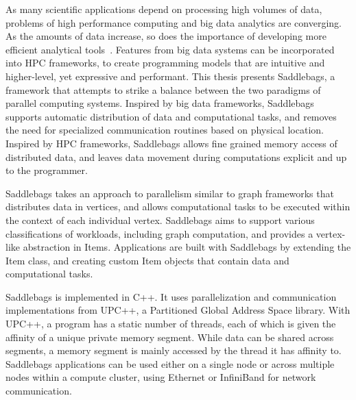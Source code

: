 \documentclass{uit-report}
\begin{document}
As many scientific applications depend on processing high volumes of data, problems of high performance computing and big data analytics are converging. As the amounts of data increase, so does the importance of developing more efficient analytical tools~\cite{hpcabds}. Features from big data systems can be incorporated into HPC frameworks, to create programming models that are intuitive and higher-level, yet expressive and performant. This thesis presents Saddlebags, a framework that attempts to strike a balance between the two paradigms of parallel computing systems. Inspired by big data frameworks, Saddlebags supports automatic distribution of data and computational tasks, and removes the need for specialized communication routines based on physical location. Inspired by HPC frameworks, Saddlebags allows fine grained memory access of distributed data, and leaves data movement during computations explicit and up to the programmer.

Saddlebags takes an approach to parallelism similar to graph frameworks \cite{pregel} \cite{giraph} that distributes data in vertices, and allows computational tasks to be executed within the context of each individual vertex. Saddlebags aims to support various classifications of workloads, including graph computation, and provides a vertex-like abstraction in Items. Applications are built with Saddlebags by extending the Item class, and creating custom Item objects that contain data and computational tasks.

Saddlebags is implemented in C++. It uses parallelization and communication implementations from UPC++, a Partitioned Global Address Space library. With UPC++, a program has a static number of threads, each of which is given the affinity of a unique private memory segment. While data can be shared across segments, a memory segment is mainly accessed by the thread it has affinity to. Saddlebags applications can be used either on a single node or across multiple nodes within a compute cluster, using Ethernet or InfiniBand for network communication.







\end{document}
